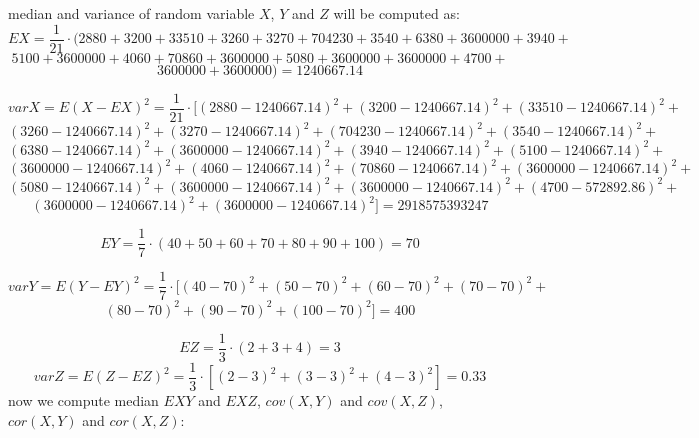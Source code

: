 \documentclass[11pt,twoside,a4paper]{book}
\begin{document}





median and variance of random variable $X$, $Y$ and $Z$ will be computed as:
$$EX = \frac{1}{21}\cdot(2 880 + 3 200 +33 510  + 3 260 + 3 270 
 + 704 230 + 3
540+6 380 +3600000 + 3 940 +$$
$$ 5 100+3600000 + 4 060 + 70 860+3600000 + 5 080 + 3600 000+3600000+ 4
700 +$$
$$ 3600 000+3600000)=1240667.14$$

$$varX=E(X-EX)^2=\frac{1}{21}\cdot[\left(2 880-1240667.14
\right)^2+\left(3200-1240667.14\right)^2+\left(33510 -1240667.14\right)^2+$$
$$\left(3260-1240667.14\right)^2+\left(3270-1240667.14\right)^2+\left(704230-1240667.14\right)^2+\left(3540-1240667.14\right)^2+$$
$$\left(6380-1240667.14\right)^2+\left(3600000-1240667.14\right)^2+\left(3940-1240667.14\right)^2+\left(5100-1240667.14\right)^2+$$
$$\left( 3600000
-1240667.14\right)^2+\left(4060-1240667.14\right)^2+\left(70860-1240667.14\right)^2+\left(3600000-1240667.14\right)^2+$$
$$\left(5080-1240667.14\right)^2+\left(3600000-1240667.14\right)^2+\left(3600000-1240667.14\right)^2+\left(4700-572892.86\right)^2+$$
$$\left(3600000-1240667.14\right)^2+\left(3600000-1240667.14\right)^2]=2918575393247$$

$$EY = \frac{1}{7}\cdot \left(40 +  50 +  60 +
 70 +  80 +  90 +
100\right)=70$$

$$varY=E(Y-EY)^2=\frac{1}{7}\cdot[\left(40 -70\right)^2+\left(50
-70\right)^2+\left(60 -70\right)^2+\left(70 -70\right)^2+$$
$$\left(80 -70\right)^2+\left(90 -70\right)^2+\left(100 -70\right)^2]=400$$

$$EZ = \frac{1}{3}\cdot \left(2 +  3 + 4\right)=3$$
$$varZ=E(Z-EZ)^2=\frac{1}{3}\cdot [\left(2 -  3\right)^2+\left(3 - 
3\right)^2+\left(4 -  3\right)^2]=0.33$$ 
now we compute median $EXY$ and $EXZ$, $cov(X,Y)$ and $cov(X,Z)$, $cor(X,Y)$
and $cor(X,Z)$:
\end{document}
